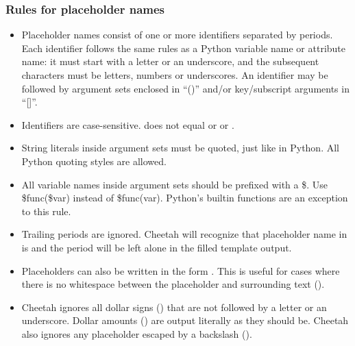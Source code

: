 \subsubsection{Rules for placeholder names}
\label{TDL.placeholders.rules}

\begin{itemize} 
     
\item Placeholder names consist of one or more identifiers separated by periods.
     Each identifier follows the same rules as a Python variable name or
     attribute name: it must start with a letter or an underscore, and the
     subsequent characters must be letters, numbers or underscores.  An
     identifier may be followed by argument sets enclosed in ``()'' and/or
     key/subscript arguments in ``[]''.

\item Identifiers are case-sensitive.  does not equal 
     or  or .     
     
\item String literals inside argument sets must be quoted, just like in Python.
     All Python quoting styles are allowed.
     
\item All variable names inside argument sets should be prefixed with a \$.  Use
     \$func(\$var) instead of \$func(var).  Python's builtin functions are an
     exception to this rule.
    
\item Trailing periods are ignored.  Cheetah will recognize that
     placeholder name in  is  and the period will
     be left alone in the filled template output.
     
\item Placeholders can also be written in the form .
     This is useful for cases where there is no whitespace between the
     placeholder and surrounding text ().
   
\item Cheetah ignores all dollar signs (\code{\$}) that are not followed by a
     letter or an underscore.  Dollar amounts () are output
     literally as they should be.  Cheetah also ignores any placeholder escaped
     by a backslash ().

\end{itemize} 

